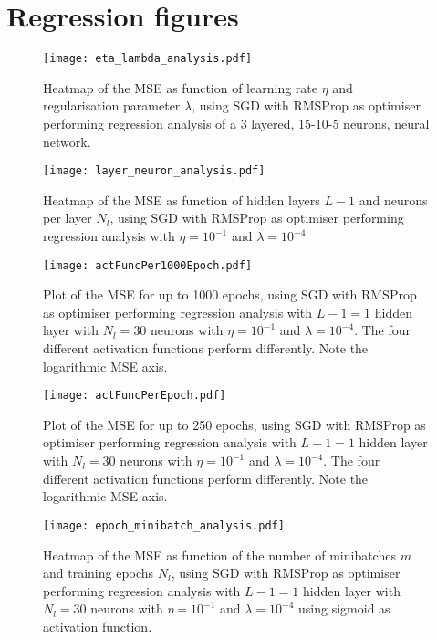 \clearpage


\appendix

\section{Regression figures}

\begin{figure}[h!]
    \texttt{[image: eta\_lambda\_analysis.pdf]}
    \caption{Heatmap of the MSE as function of learning rate $\eta$ and regularisation parameter $\lambda$, using SGD with RMSProp as optimiser performing regression analysis of a 3 layered, 15-10-5 neurons, neural network. }
    \label{fig:reg_eta_lambda}
\end{figure}

\begin{figure}[h!]
    \texttt{[image: layer\_neuron\_analysis.pdf]}
    \caption{Heatmap of the MSE as function of hidden layers $L-1$ and neurons per layer $N_l$, using SGD with RMSProp as optimiser performing regression analysis with $\eta=10^{-1}$ and $\lambda=10^{-4}$ }
    \label{fig:reg_layer_neuron}
\end{figure}

\begin{figure}[h!]
    \texttt{[image: actFuncPer1000Epoch.pdf]}
    \caption{Plot of the MSE for up to 1000 epochs, using SGD with RMSProp as optimiser performing regression analysis with $L-1=1$ hidden layer with $N_l=30$ neurons with $\eta=10^{-1}$ and $\lambda=10^{-4}$. The four different activation functions perform differently. Note the logarithmic MSE axis.}
    \label{fig:reg_act_epoch1000}
\end{figure}

\begin{figure}[h!]
    \texttt{[image: actFuncPerEpoch.pdf]}
    \caption{Plot of the MSE for up to 250 epochs, using SGD with RMSProp as optimiser performing regression analysis with $L-1=1$ hidden layer with $N_l=30$ neurons with $\eta=10^{-1}$ and $\lambda=10^{-4}$. The four different activation functions perform differently. Note the logarithmic MSE axis.}
    \label{fig:reg_act_epoch}
\end{figure}

\begin{figure}[h!]
    \texttt{[image: epoch\_minibatch\_analysis.pdf]}
    \caption{Heatmap of the MSE as function of the number of minibatches $m$ and training epochs $N_l$, using SGD with RMSProp as optimiser performing regression analysis with $L-1=1$ hidden layer with $N_l=30$ neurons with $\eta=10^{-1}$ and $\lambda=10^{-4}$ using sigmoid as activation function. }
    \label{fig:reg_minibatch_epoch}
\end{figure}




